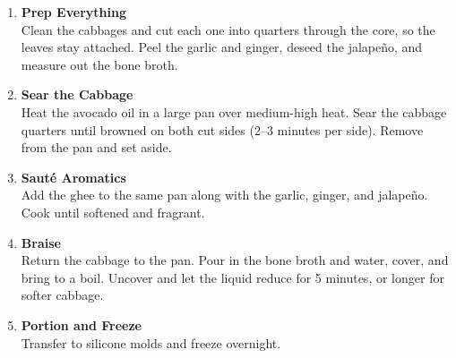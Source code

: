 \begin{enumerate}

      \item \textbf{Prep Everything} \\
            Clean the cabbages and cut each one into quarters through the core, so the leaves stay attached. Peel the garlic and ginger, deseed the jalapeño, and measure out the bone broth.

      \item \textbf{Sear the Cabbage} \\
            Heat the avocado oil in a large pan over medium-high heat. Sear the cabbage quarters until browned on both cut sides (2--3 minutes per side). Remove from the pan and set aside.

      \item \textbf{Sauté Aromatics} \\
            Add the ghee to the same pan along with the garlic, ginger, and jalapeño. Cook until softened and fragrant.

      \item \textbf{Braise} \\
            Return the cabbage to the pan. Pour in the bone broth and water, cover, and bring to a boil. Uncover and let the liquid reduce for 5 minutes, or longer for softer cabbage.

      \item \textbf{Portion and Freeze} \\
            Transfer to silicone molds and freeze overnight.

\end{enumerate}


